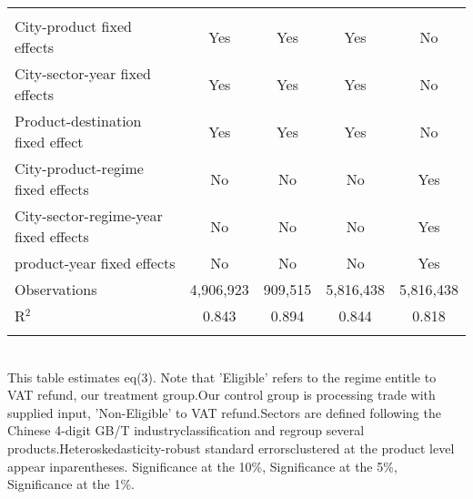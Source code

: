 \documentclass[preview]{standalone}
\begin{document}
\begin{table}[!htbp]
\begin{adjustbox}{width=\textwidth, totalheight=\baselineskip,keepaspectratio}
\begin{tabular}{@{\extracolsep{5pt}}lcccc}
 \hline \\[-1.8ex] 
City-product fixed effects & Yes & Yes & Yes & No \\ 
City-sector-year fixed effects & Yes & Yes & Yes & No \\ 
Product-destination fixed effect & Yes & Yes & Yes & No \\ 
City-product-regime fixed effects & No & No & No & Yes \\ 
City-sector-regime-year fixed effects & No & No & No & Yes \\ 
product-year fixed effects & No & No & No & Yes \\ 
Observations & 4,906,923 & 909,515 & 5,816,438 & 5,816,438 \\ 
R$^{2}$ & 0.843 & 0.894 & 0.844 & 0.818 \\ 
\hline 
\hline \\[-1.8ex] 
\end{tabular}
\end{adjustbox}
\begin{tablenotes} 
 \small 
 \item \\ 
This table estimates eq(3). Note that 'Eligible' refers to the regime entitle to VAT refund, our treatment group.Our control group is processing trade with supplied input, 'Non-Eligible' to VAT refund.Sectors are defined following the Chinese 4-digit GB/T industryclassification and regroup several products.Heteroskedasticity-robust standard errorsclustered at the product level appear inparentheses.\sym{*} Significance at the 10\%, \sym{**} Significance at the 5\%, \sym{***} Significance at the 1\%. 
\end{tablenotes}
\end{table}
\end{document}
